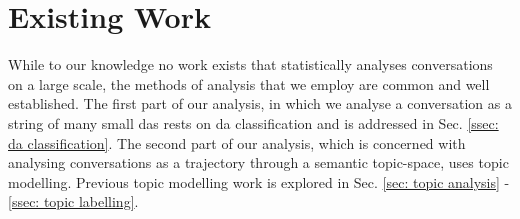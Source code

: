 \chapter{Existing Work}

While to our knowledge no work exists that statistically analyses conversations on a large scale, the methods of analysis that we employ are common and well established. The first part of our analysis, in which we analyse a conversation as a string of many small \glspl{da} rests on \gls{da} classification and is addressed in Sec. \ref{ssec: da classification}. The second part of our analysis, which is concerned with analysing conversations as a trajectory through a semantic topic-space, uses topic modelling. Previous topic modelling work is explored in Sec. \ref{sec: topic analysis} - \ref{ssec: topic labelling}.



 

 


\glsresetall